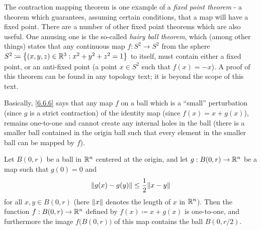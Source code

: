 \begin{rmk}\label{6.6.5}
  The contraction mapping theorem is one example of a \emph{fixed point theorem}
  - a theorem which guarantees, assuming certain conditions, that a map will have a fixed point.
  There are a number of other fixed point theorems which are also useful.
  One amusing one is the so-called \emph{hairy ball theorem}, which (among other things) states that any continuous map \(f : S^2 \to S^2\) from the sphere \(S^2 \coloneqq \set{(x, y, z) \in \R^3 : x^2 + y^2 + z^2 = 1}\) to itself, must contain either a fixed point, or an anti-fixed point
  (a point \(x \in S^2\) such that \(f(x) = -x\)).
  A proof of this theorem can be found in any topology text;
  it is beyond the scope of this text.
\end{rmk}

\begin{note}
  Basically, \cref{6.6.6} says that any map \(f\) on a ball which is a ``small'' perturbation (since \(g\) is a strict contraction) of the identity map (since \(f(x) = x + g(x)\)), remains one-to-one and cannot create any internal holes in the ball
  (there is a smaller ball contained in the origin ball such that every element in the smaller ball can be mapped by \(f\)).
\end{note}

\begin{lem}\label{6.6.6}
  Let \(B(0, r)\) be a ball in \(\R^n\) centered at the origin, and let \(g : B(0, r) \to \R^n\) be a map such that \(g(0) = 0\) and
  \[
    \norm*{g(x) - g(y)} \leq \dfrac{1}{2} \norm*{x - y}
  \]
  for all \(x, y \in B(0, r)\)
  (here \(\norm*{x}\) denotes the length of \(x\) in \(\R^n\)).
  Then the function \(f : B(0, r) \to \R^n\) defined by \(f(x) \coloneqq x + g(x)\) is one-to-one, and furthermore the image \(f\big(B(0, r)\big)\) of this map contains the ball \(B(0, r / 2)\).
\end{lem}

